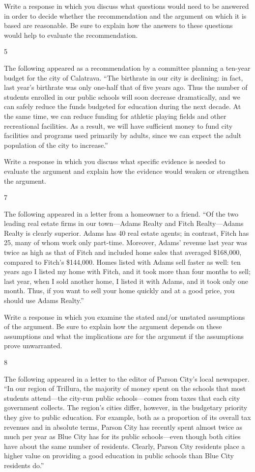 \documentclass[]{article}
\begin{document}
Write a response in which you discuss what questions would need to be
answered in order to decide whether the recommendation and the argument
on which it is based are reasonable. Be sure to explain how the answers
to these questions would help to evaluate the recommendation.

5

The following appeared as a recommendation by a committee planning a
ten-year budget for the city of Calatrava. ``The birthrate in our city
is declining: in fact, last year's birthrate was only one-half that of
five years ago. Thus the number of students enrolled in our public
schools will soon decrease dramatically, and we can safely reduce the
funds budgeted for education during the next decade. At the same time,
we can reduce funding for athletic playing fields and other recreational
facilities. As a result, we will have sufficient money to fund city
facilities and programs used primarily by adults, since we can expect
the adult population of the city to increase.''

Write a response in which you discuss what specific evidence is needed
to evaluate the argument and explain how the evidence would weaken or
strengthen the argument.

7

The following appeared in a letter from a homeowner to a friend. ``Of
the two leading real estate firms in our town---Adams Realty and Fitch
Realty---Adams Realty is clearly superior. Adams has 40 real estate
agents; in contrast, Fitch has 25, many of whom work only part-time.
Moreover, Adams' revenue last year was twice as high as that of Fitch
and included home sales that averaged \$168,000, compared to Fitch's
\$144,000. Homes listed with Adams sell faster as well: ten years ago I
listed my home with Fitch, and it took more than four months to sell;
last year, when I sold another home, I listed it with Adams, and it took
only one month. Thus, if you want to sell your home quickly and at a
good price, you should use Adams Realty.''

Write a response in which you examine the stated and/or unstated
assumptions of the argument. Be sure to explain how the argument depends
on these assumptions and what the implications are for the argument if
the assumptions prove unwarranted.

8

The following appeared in a letter to the editor of Parson City's local
newspaper. ``In our region of Trillura, the majority of money spent on
the schools that most students attend---the city-run public
schools---comes from taxes that each city government collects. The
region's cities differ, however, in the budgetary priority they give to
public education. For example, both as a proportion of its overall tax
revenues and in absolute terms, Parson City has recently spent almost
twice as much per year as Blue City has for its public schools---even
though both cities have about the same number of residents. Clearly,
Parson City residents place a higher value on providing a good education
in public schools than Blue City residents do.''
\end{document}
